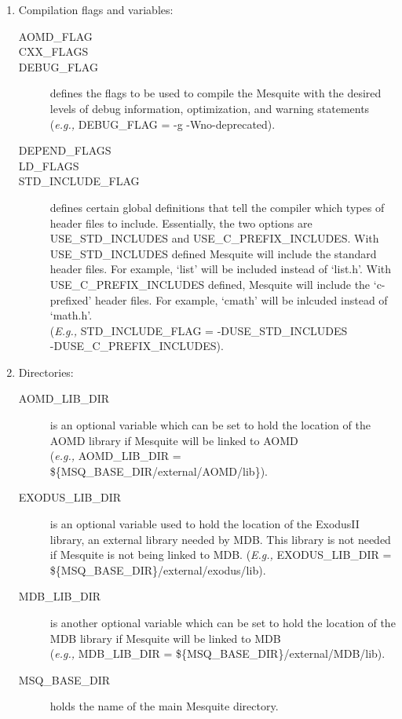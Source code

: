 \documentclass[psfig]{article}
\begin{document}
\begin{enumerate}
\item Compilation flags and variables:
  \begin{description}
  \item[AOMD\_FLAG]
  \item[CXX\_FLAGS]
  \item[DEBUG\_FLAG] defines the flags to be used to compile the Mesquite
	with the desired levels of debug information, optimization, and
	warning statements\\
	({\it e.g.,} DEBUG\_FLAG = -g -Wno-deprecated).
  \item[DEPEND\_FLAGS]
  \item[LD\_FLAGS]
  \item[STD\_INCLUDE\_FLAG] defines certain global definitions that
	tell the compiler which types of header files to include.
 	Essentially, the two options are USE\_STD\_INCLUDES and
	USE\_C\_PREFIX\_INCLUDES.  With USE\_STD\_INCLUDES defined
	Mesquite will include the standard header files.  For example,
	`list' will be included instead of `list.h'.  With
	USE\_C\_PREFIX\_INCLUDES defined, Mesquite will include the
	`c-prefixed' header files.  For example, `cmath' will be
	inlcuded instead of `math.h'.  \\
	({\it E.g.,} STD\_INCLUDE\_FLAG = -DUSE\_STD\_INCLUDES\\
	-DUSE\_C\_PREFIX\_INCLUDES).
  \end{description}
\item Directories:
  \begin{description}
  \item[AOMD\_LIB\_DIR] is an optional variable which can be set
	to hold the location of the AOMD library if Mesquite will
	be linked to AOMD\\
	({\it e.g.,} AOMD\_LIB\_DIR = \$\{MSQ\_BASE\_DIR/external/AOMD/lib\}).
  \item[EXODUS\_LIB\_DIR] is an optional variable used to hold the
	location of the ExodusII library, an external library needed
	by MDB.  This library is not needed if Mesquite is not being
	linked to MDB.
	({\it E.g.,} EXODUS\_LIB\_DIR = \$\{MSQ\_BASE\_DIR\}/external/exodus/lib).
  \item[MDB\_LIB\_DIR] is another optional variable which can be set
	to hold the location of the MDB library if Mesquite will
	be linked to MDB\\
	({\it e.g.,} MDB\_LIB\_DIR = \$\{MSQ\_BASE\_DIR\}/external/MDB/lib).
  \item[MSQ\_BASE\_DIR] holds the name of the main Mesquite directory.

\end{description}
\end{enumerate}
\end{document}
